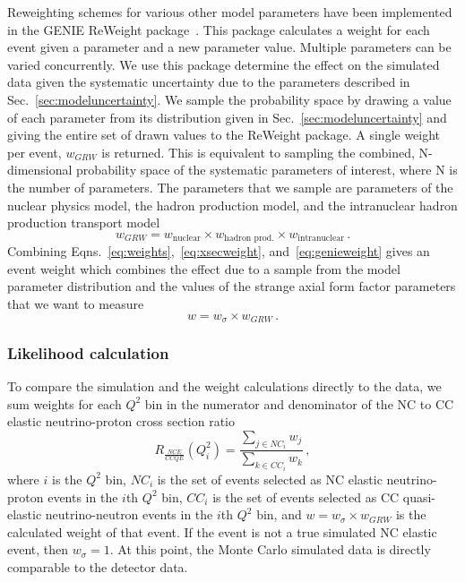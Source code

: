     Reweighting schemes for various other model parameters have been
    implemented in the GENIE ReWeight package~\cite{GENIE}. This package
    calculates a weight for each event given a parameter and a new parameter
    value. Multiple parameters can be varied concurrently. We use this package
    determine the effect on the simulated data given the systematic uncertainty
    due to the parameters described in Sec.~\ref{sec:modeluncertainty}. We
    sample the probability space by drawing a value of each parameter from its
    distribution given in Sec.~\ref{sec:modeluncertainty} and giving the entire
    set of drawn values to the ReWeight package. A single weight per event,
    $w_{GRW}$ is returned. This is equivalent to sampling the combined,
    N-dimensional probability space of the systematic parameters of interest,
    where N is the number of parameters. The parameters that we sample are
    parameters of the nuclear physics model, the hadron production model, and
    the intranuclear hadron production transport model
    \begin{equation}\label{eq:genieweight}
      w_{GRW} = w_{\textrm{nuclear}}\times w_{\textrm{hadron prod.}}\times
                w_{\textrm{intranuclear}} \,.
    \end{equation}
    Combining Eqns.~\ref{eq:weights},~\ref{eq:xsecweight},
    and~\ref{eq:genieweight} gives an event weight which combines the effect
    due to a sample from the model parameter distribution and the values of the
    strange axial form factor parameters that we want to measure
    \begin{equation}
      w = w_{\sigma}\times w_{GRW} \,.
    \end{equation}

  \subsubsection{Likelihood calculation}\label{sec:likelihood}
    To compare the simulation and the weight calculations directly to the data,
    we sum weights for each $Q^2$ bin in the numerator and denominator of the
    NC to CC elastic neutrino-proton cross section ratio
    \begin{equation}\label{eq:expected}
      R_{\frac{NCE}{CCQE}}(Q^2_i) = \frac{\sum\limits_{j\in NC_i} w_j}{\sum\limits_{k\in CC_i} w_k} \,,
    \end{equation}
    where $i$ is the $Q^2$ bin, $NC_i$ is the set of events selected as NC
    elastic neutrino-proton events in the $i$th $Q^2$ bin, $CC_i$ is the set of
    events selected as CC quasi-elastic neutrino-neutron events in the $i$th
    $Q^2$ bin, and $w = w_\sigma\times w_{GRW}$ is the calculated weight of
    that event. If the event is not a true simulated NC elastic event, then
    $w_\sigma = 1$. At this point, the Monte Carlo simulated data is directly
    comparable to the detector data.

